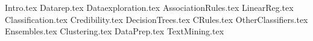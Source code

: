 \documentclass[12pt]{article} %
\begin{document}
{Intro.tex}
{Datarep.tex}
{Dataexploration.tex}
{AssociationRules.tex}
{LinearReg.tex}
{Classification.tex}
{Credibility.tex}
{DecisionTrees.tex}
{CRules.tex}
{OtherClassifiers.tex}
{Ensembles.tex}
{Clustering.tex}
{DataPrep.tex}
{TextMining.tex}
\end{document}
